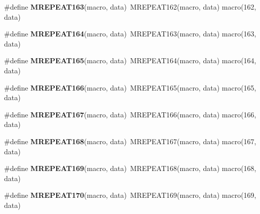 \begin{DoxyCompactItemize}
\item 
\hypertarget{group__group__xmega__utils__mrepeat_ga24257587ba592ff6daf20d7ccc16d3a1}{\#define {\bfseries M\-R\-E\-P\-E\-A\-T163}(macro, data)~M\-R\-E\-P\-E\-A\-T162(macro, data)   macro(162, data)}\label{group__group__xmega__utils__mrepeat_ga24257587ba592ff6daf20d7ccc16d3a1}

\item 
\hypertarget{group__group__xmega__utils__mrepeat_ga5635a788c18814a98cca65d80c06dbfb}{\#define {\bfseries M\-R\-E\-P\-E\-A\-T164}(macro, data)~M\-R\-E\-P\-E\-A\-T163(macro, data)   macro(163, data)}\label{group__group__xmega__utils__mrepeat_ga5635a788c18814a98cca65d80c06dbfb}

\item 
\hypertarget{group__group__xmega__utils__mrepeat_gaf19e2008c064792f7ae367fab6867c12}{\#define {\bfseries M\-R\-E\-P\-E\-A\-T165}(macro, data)~M\-R\-E\-P\-E\-A\-T164(macro, data)   macro(164, data)}\label{group__group__xmega__utils__mrepeat_gaf19e2008c064792f7ae367fab6867c12}

\item 
\hypertarget{group__group__xmega__utils__mrepeat_ga75661c9e3f382a6d40eb9da43d79f2d0}{\#define {\bfseries M\-R\-E\-P\-E\-A\-T166}(macro, data)~M\-R\-E\-P\-E\-A\-T165(macro, data)   macro(165, data)}\label{group__group__xmega__utils__mrepeat_ga75661c9e3f382a6d40eb9da43d79f2d0}

\item 
\hypertarget{group__group__xmega__utils__mrepeat_ga252652614e5e3cb056e487b105bd598c}{\#define {\bfseries M\-R\-E\-P\-E\-A\-T167}(macro, data)~M\-R\-E\-P\-E\-A\-T166(macro, data)   macro(166, data)}\label{group__group__xmega__utils__mrepeat_ga252652614e5e3cb056e487b105bd598c}

\item 
\hypertarget{group__group__xmega__utils__mrepeat_ga4aa9bd592bf0f9b8f03254451d8693da}{\#define {\bfseries M\-R\-E\-P\-E\-A\-T168}(macro, data)~M\-R\-E\-P\-E\-A\-T167(macro, data)   macro(167, data)}\label{group__group__xmega__utils__mrepeat_ga4aa9bd592bf0f9b8f03254451d8693da}

\item 
\hypertarget{group__group__xmega__utils__mrepeat_ga1ae14784af3853b01de5837b32a0fdd6}{\#define {\bfseries M\-R\-E\-P\-E\-A\-T169}(macro, data)~M\-R\-E\-P\-E\-A\-T168(macro, data)   macro(168, data)}\label{group__group__xmega__utils__mrepeat_ga1ae14784af3853b01de5837b32a0fdd6}

\item 
\hypertarget{group__group__xmega__utils__mrepeat_gaf79db8520fe014aa43b33eca106b66df}{\#define {\bfseries M\-R\-E\-P\-E\-A\-T170}(macro, data)~M\-R\-E\-P\-E\-A\-T169(macro, data)   macro(169, data)}\label{group__group__xmega__utils__mrepeat_gaf79db8520fe014aa43b33eca106b66df}


\end{DoxyCompactItemize}
